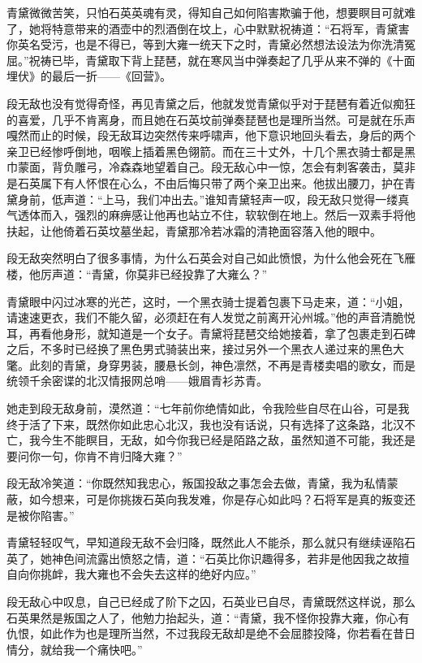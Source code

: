 青黛微微苦笑，只怕石英英魂有灵，得知自己如何陷害欺骗于他，想要瞑目可就难了，她将特意带来的酒壶中的烈酒倒在坟上，心中默默祝祷道：“石将军，青黛害你英名受污，也是不得已，等到大雍一统天下之时，青黛必然想法设法为你洗清冤屈。”祝祷已毕，青黛取下背上琵琶，就在寒风当中弹奏起了几乎从来不弹的《十面埋伏》的最后一折——《回营》。

段无敌也没有觉得奇怪，再见青黛之后，他就发觉青黛似乎对于琵琶有着近似痴狂的喜爱，几乎不肯离身，而且她在石英坟前弹奏琵琶也是理所当然。可是就在乐声嘎然而止的时候，段无敌耳边突然传来呼啸声，他下意识地回头看去，身后的两个亲卫已经惨呼倒地，咽喉上插着黑色翎箭。而在三十丈外，十几个黑衣骑士都是黑巾蒙面，背负雕弓，冷森森地望着自己。段无敌心中一惊，怎会有刺客袭击，莫非是石英属下有人怀恨在心么，不由后悔只带了两个亲卫出来。他拔出腰刀，护在青黛身前，低声道：“上马，我们冲出去。”谁知青黛轻声一叹，段无敌只觉得一缕真气透体而入，强烈的麻痹感让他再也站立不住，软软倒在地上。然后一双素手将他扶起，让他倚着石英坟墓坐起，青黛那冷若冰霜的清艳面容落入他的眼中。

段无敌突然明白了很多事情，为什么石英会对自己如此愤恨，为什么他会死在飞雁楼，他厉声道：“青黛，你莫非已经投靠了大雍么？”

青黛眼中闪过冰寒的光芒，这时，一个黑衣骑士提着包裹下马走来，道：“小姐，请速速更衣，我们不能久留，必须赶在有人发觉之前离开沁州城。”他的声音清脆悦耳，再看他身形，就知道是一个女子。青黛将琵琶交给她接着，拿了包裹走到石碑之后，不多时已经换了黑色男式骑装出来，接过另外一个黑衣人递过来的黑色大氅。此刻的青黛，身穿男装，腰悬长剑，神色凛然，不再是青楼卖唱的歌女，而是统领千余密谍的北汉情报网总哨——娥眉青衫苏青。

她走到段无敌身前，漠然道：“七年前你绝情如此，令我险些自尽在山谷，可是我终于活了下来，既然你如此忠心北汉，我也没有话说，只有选择了这条路，北汉不亡，我今生不能瞑目，无敌，如今你我已经是陌路之敌，虽然知道不可能，我还是要问你一句，你肯不肯归降大雍？”

段无敌冷笑道：“你既然知我忠心，叛国投敌之事怎会去做，青黛，我为私情蒙蔽，如今想来，可是你挑拨石英向我发难，你是存心如此吗？石将军是真的叛变还是被你陷害。”

青黛轻轻叹气，早知道段无敌不会归降，既然此人不能杀，那么就只有继续诬陷石英了，她神色间流露出愤怒之情，道：“石英比你识趣得多，若非是他因我之故擅自向你挑衅，我大雍也不会失去这样的绝好内应。”

段无敌心中叹息，自己已经成了阶下之囚，石英业已自尽，青黛既然这样说，那么石英果然是叛国之人了，他勉力抬起头，道：“青黛，我不怪你投靠大雍，你心有仇恨，如此作为也是理所当然，不过我段无敌却是绝不会屈膝投降，你若看在昔日情分，就给我一个痛快吧。”

